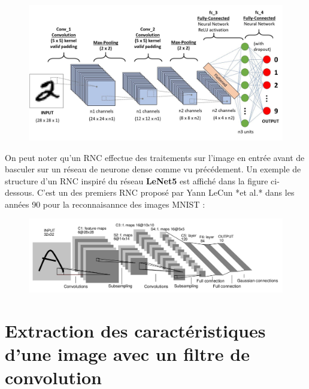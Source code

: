 \documentclass{article}
\begin{document}
\begin{figure}[H]
\centering
\includegraphics[width=1\textwidth]{img/cnn.jpeg}
\end{figure}


On peut noter qu'un RNC effectue des traitements sur l'image en entrée 
avant de basculer sur un réseau de neurone dense comme vu précédement.
Un exemple de structure d'un RNC inspiré du réseau \textbf{LeNet5}
est affiché dans la figure ci-dessous. 
C'est un des premiers RNC proposé par Yann LeCun *et al.* 
dans les années 90 pour la reconnaisannce des images MNIST :

\begin{figure}[H]
\centering
\includegraphics[width=1\textwidth]{img/LeNet5.png}
\end{figure}

\newpage

\section{Extraction des caractéristiques d'une image avec un filtre de convolution}
\end{document}

